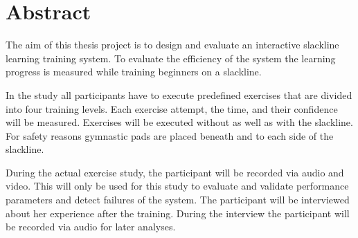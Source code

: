 \section*{Abstract}
The aim of this thesis project is to design and evaluate an interactive slackline learning training system. To evaluate the efficiency of the system the learning progress is measured while training beginners on a slackline.

In the study all participants have to execute predefined exercises that are divided into four training levels. Each exercise attempt, the time, and their confidence will be measured. Exercises will be executed without as well as with the slackline. For safety reasons gymnastic pads are placed beneath and to each side of the slackline.

During the actual exercise study, the participant will be recorded via audio and video. This will only be used for this study to evaluate and validate performance parameters and detect failures of the system. The participant will be interviewed about her experience after the training. During the interview the participant will be recorded via audio for later analyses.

